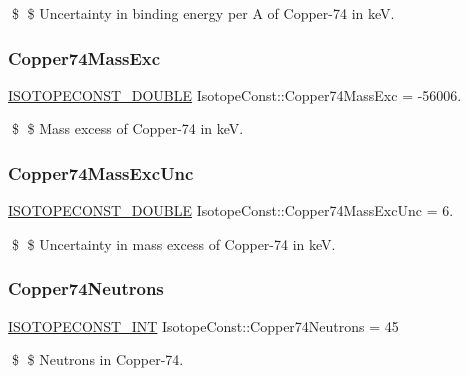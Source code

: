\$ \$ Uncertainty in binding energy per A of Copper-\/74 in keV. \mbox{\label{group___isotope_const-_copper-_cu74_ga0513f9e8bc0c522e8d96c3c6e435f46f}} 
\subsubsection{\texorpdfstring{Copper74\+Mass\+Exc}{Copper74MassExc}}
{\footnotesize\ttfamily \mbox{\hyperlink{group___isotope_const-_macros_ga8f45a7272ce02c0b4c65c44636ed719a}{I\+S\+O\+T\+O\+P\+E\+C\+O\+N\+S\+T\+\_\+\+D\+O\+U\+B\+LE}} Isotope\+Const\+::\+Copper74\+Mass\+Exc = -\/56006.}

\$ \$ Mass excess of Copper-\/74 in keV. \mbox{\label{group___isotope_const-_copper-_cu74_ga98e16f1849c42c4d6d626f98bbc6e770}} 
\subsubsection{\texorpdfstring{Copper74\+Mass\+Exc\+Unc}{Copper74MassExcUnc}}
{\footnotesize\ttfamily \mbox{\hyperlink{group___isotope_const-_macros_ga8f45a7272ce02c0b4c65c44636ed719a}{I\+S\+O\+T\+O\+P\+E\+C\+O\+N\+S\+T\+\_\+\+D\+O\+U\+B\+LE}} Isotope\+Const\+::\+Copper74\+Mass\+Exc\+Unc = 6.}

\$ \$ Uncertainty in mass excess of Copper-\/74 in keV. \mbox{\label{group___isotope_const-_copper-_cu74_gab8c99fde43a45828532b59eaee2823f0}} 
\subsubsection{\texorpdfstring{Copper74\+Neutrons}{Copper74Neutrons}}
{\footnotesize\ttfamily \mbox{\hyperlink{group___isotope_const-_macros_ga5f18360b3e99483a35c32d789e62621c}{I\+S\+O\+T\+O\+P\+E\+C\+O\+N\+S\+T\+\_\+\+I\+NT}} Isotope\+Const\+::\+Copper74\+Neutrons = 45}

\$ \$ Neutrons in Copper-\/74. \mbox{\label{group___isotope_const-_copper-_cu74_ga43c8f7f3bf026cf8645521586d73c0ce}} 
